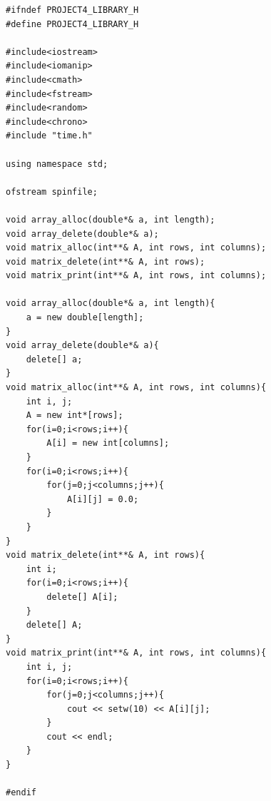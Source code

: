 \documentclass[11pt,a4paper]{article}
\begin{document}
\begin{lstlisting}[title={project4-library.h}]
#ifndef PROJECT4_LIBRARY_H
#define PROJECT4_LIBRARY_H

#include<iostream>
#include<iomanip>
#include<cmath>
#include<fstream>
#include<random>
#include<chrono>
#include "time.h"

using namespace std;

ofstream spinfile;

void array_alloc(double*& a, int length);
void array_delete(double*& a);
void matrix_alloc(int**& A, int rows, int columns);
void matrix_delete(int**& A, int rows);
void matrix_print(int**& A, int rows, int columns);

void array_alloc(double*& a, int length){
	a = new double[length];
}
void array_delete(double*& a){
	delete[] a;
}
void matrix_alloc(int**& A, int rows, int columns){
	int i, j;
	A = new int*[rows];
	for(i=0;i<rows;i++){
		A[i] = new int[columns];
	}
	for(i=0;i<rows;i++){
		for(j=0;j<columns;j++){
			A[i][j] = 0.0;
		}
	}
}
void matrix_delete(int**& A, int rows){
	int i;
	for(i=0;i<rows;i++){
		delete[] A[i];
	}
	delete[] A;
}
void matrix_print(int**& A, int rows, int columns){
	int i, j;
	for(i=0;i<rows;i++){
		for(j=0;j<columns;j++){
			cout << setw(10) << A[i][j];
		}
		cout << endl;
	}
}

#endif
\end{lstlisting}
\end{document}
